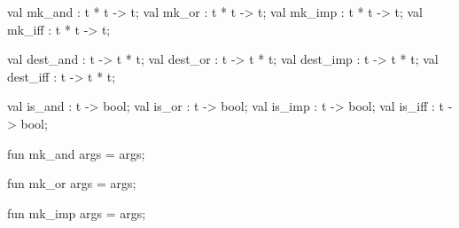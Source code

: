 \nwenddocs{}\plusendmoddef\nwstartdeflinemarkup{}\nwenddeflinemarkup
val mk_and : t * t -> t;
val mk_or : t * t -> t;
val mk_imp : t * t -> t;
val mk_iff : t * t -> t;

val dest_and : t -> t * t;
val dest_or : t -> t * t;
val dest_imp : t -> t * t;
val dest_iff : t -> t * t;

val is_and : t -> bool;
val is_or : t -> bool;
val is_imp : t -> bool;
val is_iff : t -> bool;
\nwendcode{}\nwdocspar

\nwenddocs{}\plusendmoddef\nwstartdeflinemarkup{}\nwenddeflinemarkup
fun mk_and args =  args;

fun mk_or args =  args;

fun mk_imp args =  args;

